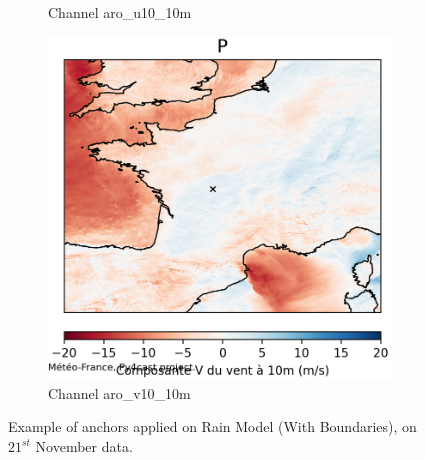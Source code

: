 \begin{figure}[h]
\begin{subfigure}[b]{0.49\textwidth}
        \caption{Channel aro\_u10\_10m}
    \end{subfigure}
    \hfill
    \begin{subfigure}[b]{0.49\textwidth}
        \includegraphics[width=\textwidth]{Images/titan_rain_anchors/nov-21/rain-arp/2023112100_feature_aro_v10_10m.png}
        \caption{Channel aro\_v10\_10m}
    \end{subfigure}
    \caption{Example of anchors applied on Rain Model (With Boundaries), on $21^{st}$ November data.}
    \label{fig:titan-rain-arp-anchors-21}
\end{figure}

